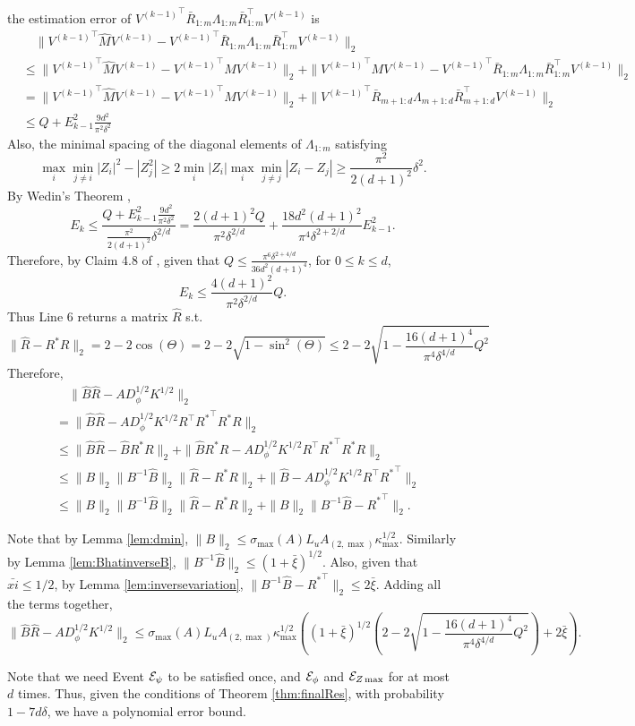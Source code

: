 the estimation error of ${V^{(k-1)}}^\top\bar{R}_{1:m}\Lambda_{1:m} \bar{R}_{1:m}^{\top} V^{(k-1)}$ is 
\begin{align*}
& \quad \| {V^{(k-1)}}^\top \hat{M}V^{(k-1)} - {V^{(k-1)}}^\top\bar{R}_{1:m}\Lambda_{1:m} \bar{R}_{1:m}^{\top} V^{(k-1)} \|_2 \\
& \le \|{V^{(k-1)}}^\top \hat{M}V^{(k-1)} - {V^{(k-1)}}^\top MV^{(k-1)}\|_2 + \| {V^{(k-1)}}^\top MV^{(k-1)} -{V^{(k-1)}}^\top\bar{R}_{1:m}\Lambda_{1:m} \bar{R}_{1:m}^{\top} V^{(k-1)} \|_2 \\
&  = \|{V^{(k-1)}}^\top \hat{M}V^{(k-1)} - {V^{(k-1)}}^\top MV^{(k-1)}\|_2 + \|{V^{(k-1)}}^\top\bar{R}_{m+1:d}\Lambda_{m+1:d}\bar{R}_{m+1:d}^{\top} V^{(k-1)} \|_2 \\
& \le Q + E_{k-1}^2 \frac{9d^2}{\pi^2\delta^2} 
\end{align*}
Also, the minimal spacing of the diagonal elements of $\Lambda_{1:m}$ satisfying
\[
\max_i\min_{j\neq i} |Z_i|^2 - |Z_j^2| \ge 2\min_i |Z_i| \max_i\min_{j\neq j} |Z_i - Z_j| \ge \frac{\pi^2}{2(d+1)^2}\delta^2.
\] 
By Wedin's Theorem \citep{stewart1990matrix}, 
\[
E_k \le \frac{Q + E_{k-1}^2 \frac{9d^2}{\pi^2\delta^2} }{\frac{\pi^2}{2(d+1)^2}\delta^{2/d}} = \frac{2(d+1)^2Q}{\pi^2\delta^{2/d}} + \frac{18d^2(d+1)^2}{\pi^4\delta^{2+2/d}}E_{k-1}^2.
\]
Therefore, by Claim 4.8 of \citet{vempala2014max}, given that $Q\le \frac{\pi^6\delta^{2+4/d}}{36d^2(d+1)^4}$, for $0\le k\le d$,
\[
E_k \le \frac{4(d+1)^2}{\pi^2\delta^{2/d}}Q. 
\]
Thus Line 6 returns a matrix $\hat{R}$ s.t.
\[
\|\hat{R} - R^*R\|_2 = 2-2\cos(\Theta)= 2 - 2\sqrt{1-\sin^2(\Theta)} \le 2 - 2\sqrt{1-\frac{16(d+1)^4}{\pi^4\delta^{4/d}}Q^2}
\]
Therefore,
\begin{align*}
& \quad \| \hat{B}\hat{R} - AD_{\phi}^{1/2}K^{1/2}\|_2 \\
& = \| \hat{B}\hat{R} - AD_{\phi}^{1/2}K^{1/2}R^{\top}{R^*}^{\top}R^*R\|_2 \\
& \le \| \hat{B}\hat{R} -  \hat{B}R^*R\|_2 + \|\hat{B}R^*R - AD_{\phi}^{1/2}K^{1/2}R^{\top}{R^*}^{\top}R^*R \|_2 \\
& \le \|B\|_2\|B^{-1}\hat{B}\|_2\|\hat{R} - R^*R\|_2 + \|\hat{B} - AD_{\phi}^{1/2}K^{1/2}R^{\top}{R^*}^{\top}\|_2 \\
& \le  \|B\|_2\|B^{-1}\hat{B}\|_2\|\hat{R} - R^*R\|_2 +\|B\|_2\|B^{-1}\hat{B} - {R^*}^{\top}\|_2.
\end{align*}

Note that by Lemma \ref{lem:dmin}, 
 $ \|B\|_2 \le \sigma_{\max}(A)L_uA_{(2,\max)}\kappa_{\max}^{1/2}$. 
Similarly by Lemma \ref{lem:BhatinverseB}, $\| B^{-1}\hat{B}\|_2 \le (1+\bar{\xi})^{1/2}$. 
Also, given that $\bar{xi} \le 1/2$, by Lemma \ref{lem:inversevariation}, $\|B^{-1}\hat{B} -{R^*}^{\top}\|_2 \le 2\bar{\xi}$.
Adding all the terms together,
\[
\| \hat{B}\hat{R} - AD_{\phi}^{1/2}K^{1/2}\|_2 \le \sigma_{\max}(A)L_uA_{(2,\max)}\kappa_{\max}^{1/2}\left((1+\bar{\xi})^{1/2}\left(  2 - 2\sqrt{1-\frac{16(d+1)^4}{\pi^4\delta^{4/d}}Q^2}\right) + 2\bar{\xi}\right).
\] 

Note that we need Event $\mathcal{E}_{\psi}$ to be satisfied once, and $\mathcal{E}_{\phi}$ and $\mathcal{E}_{Z\max}$ for at most $d$ times. 
Thus, given the conditions of Theorem \ref{thm:finalRes}, with probability $1-7d\delta$, we have a polynomial error bound. 